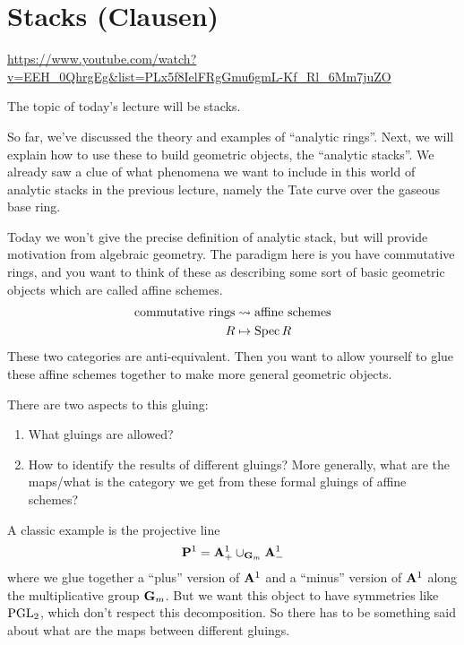 
\section{Stacks (Clausen)}

\url{https://www.youtube.com/watch?v=EEH_0QhrgEg&list=PLx5f8IelFRgGmu6gmL-Kf_Rl_6Mm7juZO}
\renewcommand{\yt}[2]{\href{https://www.youtube.com/watch?v=EEH_0QhrgEg&list=PLx5f8IelFRgGmu6gmL-Kf_Rl_6Mm7juZO&t=#1}{#2}}
\vspace{1em}

The topic of today's lecture will be stacks.

So far, we've discussed the theory and examples of ``analytic rings''. Next, we will explain how to use these to build geometric objects, the ``analytic stacks''. We already saw a clue of what phenomena we want to include in this world of analytic stacks in the previous lecture, namely the Tate curve over the gaseous base ring.

Today we won't give the precise definition of analytic stack, but will provide motivation from algebraic geometry. The paradigm here is you have commutative rings, and you want to think of these as describing some sort of basic geometric objects which are called affine schemes.
\begin{align*}
  \text{commutative rings} &\leadsto \text{affine schemes}\\
  R &\mapsto \operatorname{Spec} R
\end{align*}
These two categories are anti-equivalent. Then you want to allow yourself to glue these affine schemes together to make more general geometric objects. 

There are two aspects to this gluing:
\begin{enumerate}
  \item What gluings are allowed?
  \item How to identify the results of different gluings? More generally, what are the maps/what is the category we get from these formal gluings of affine schemes?
\end{enumerate}

A classic example is the projective line
\[ \mathbf P^1 = \mathbf A^1_+ \cup_{\mathbf G_m} \mathbf A^1_- \]
where we glue together a ``plus'' version of $\mathbf A^1$ and a ``minus'' version of $\mathbf A^1$ along the multiplicative group $\mathbf G_m$. But we want this object to have symmetries like $\operatorname{PGL}_2$, which don't respect this decomposition. So there has to be something said about what are the maps between different gluings.

